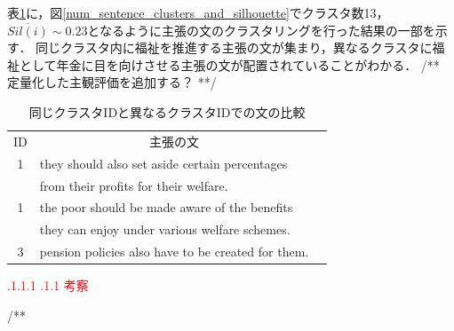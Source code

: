 \documentclass[a4paper, twocolumn, 10pt]{jarticle}
\makeatletter
\def\section{%
	\@startsection{section}{1}{\z@}%
	{.1\Cvs \@plus.1\Cdp \@minus.1\Cdp}%
	{.1\Cvs \@plus.1\Cdp}%
	{\normalfont\normalsize\bfseries}%
}
\makeatother
\begin{document}
表\ref{classification_result_samples}に，図\ref{num_sentence_clusters_and_silhouette}でクラスタ数13，$\overline{Sil(i)} \sim 0.23$となるように主張の文のクラスタリングを行った結果の一部を示す．
同じクラスタ内に福祉を推進する主張の文が集まり，異なるクラスタに福祉として年金に目を向けさせる主張の文が配置されていることがわかる．
/** 定量化した主観評価を追加する？ **/

\begin{table}[H]
  \caption{
      同じクラスタIDと異なるクラスタIDでの文の比較
    }
  \centering
  {\tabcolsep=0.05cm
    \begin{tabular}{clp{6cm}}
    \hline
    ID & \multicolumn{1}{c}{主張の文}
    \\
    1 & they should also set aside certain percentages
    \\
    & from their profits for their welfare.
    \\
    1 & the poor should be made aware of the benefits
    \\
    & they can enjoy under various welfare schemes.
    \\
    3 & pension policies also have to be created for them.
    \\
    \hline
    \end{tabular}
  }
  \label{classification_result_samples}
\end{table}














\textcolor{red}{\section{考察}}

/**
\end{document}

